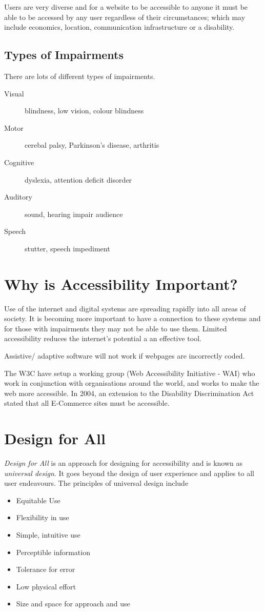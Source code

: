 Users are very diverse and for a website to be accessible to anyone it must be able to be accessed by any user regardless of their circumstances; which may include economics, location, communication infrastructure or a disability.

\subsection*{Types of Impairments}
There are lots of different types of impairments.
\begin{description}
    \item[Visual] blindness, low vision, colour blindness
    \item[Motor] cerebal palsy, Parkinson's disease, arthritis
    \item[Cognitive] dyslexia, attention deficit disorder
    \item[Auditory] sound, hearing impair audience
    \item[Speech] stutter, speech impediment
\end{description}


\section*{Why is Accessibility Important?}
Use of the internet and digital systems are spreading rapidly into all areas of society. It is becoming more important to have a connection to these systems and for those with impairments they may not be able to use them. Limited accessibility reduces the internet's potential a an effective tool.

Assistive/ adaptive software will not work if webpages are incorrectly coded. 

The W3C have setup a working group (Web Accessibility Initiative - WAI) who work in conjunction with organisations around the world, and works to make the web more accessible. In 2004, an extension to the Disability Discrimination Act stated that all E-Commerce sites must be accessible.

\section*{Design for All}
\textit{Design for All} is an approach for designing for accessibility and is known as \textit{universal design}. It goes beyond the design of user experience and applies to all user endeavours. The principles of universal design include
\begin{itemize}
    \item Equitable Use
    \item Flexibility in use
    \item Simple, intuitive use
    \item Perceptible information
    \item Tolerance for error
    \item Low physical effort
    \item Size and space for approach and use
\end{itemize}

